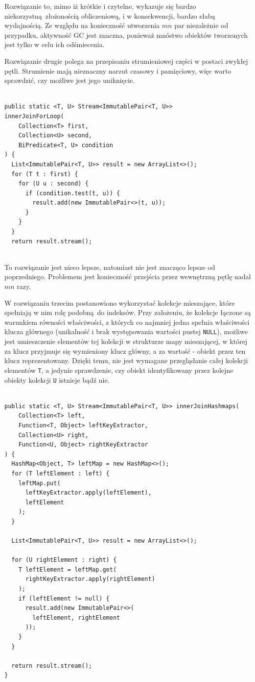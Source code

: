 \documentclass[12pt]{extarticle}
\begin{document}
    Rozwiązanie to, mimo iż krótkie i czytelne, wykazuje się bardzo niekorzystną złożonością obliczeniową, i w konsekwencji, bardzo słabą wydajnością. Ze względu na konieczność utworzenia $ mn $ par niezależnie od przypadku, aktywność GC jest znaczna, ponieważ mnóstwo obiektów tworzonych jest tylko w celu ich odśmiecenia.

    Rozwiązanie drugie polega na przepisaniu strumieniowej części w postaci zwykłej pętli. Strumienie mają nieznaczny narzut czasowy i pamięciowy, więc warto sprawdzić, czy możliwe jest jego uniknięcie.

\begin{lstlisting}[label=join2, caption=Rozwiązanie nr 2]

public static <T, U> Stream<ImmutablePair<T, U>>
innerJoinForLoop(
    Collection<T> first,
    Collection<U> second,
    BiPredicate<T, U> condition
) {
  List<ImmutablePair<T, U>> result = new ArrayList<>();
  for (T t : first) {
    for (U u : second) {
      if (condition.test(t, u)) {
        result.add(new ImmutablePair<>(t, u));
      }
    }
  }
  return result.stream();
    

\end{lstlisting}

    To rozwiązanie jest nieco lepsze, natomiast nie jest znacząco lepsze od poprzedniego. Problemem jest konieczność przejścia przez wewnętrzną pętlę nadal $ mn $ razy.

    W rozwiązaniu trzecim postanowiono wykorzystać kolekcje mieszające, które spełniają w nim rolę podobną do indeksów. Przy założeniu, że kolekcje łączone są warunkiem równości właściwości, z których co najmniej jedna spełnia właściwości klucza głównego (unikalność i brak występowania wartości pustej \texttt{NULL}), możliwe jest umieszczenie elementów tej kolekcji w strukturze mapy mieszającej, w której za klucz przyjmuje się wymieniony klucz główny, a za wartość - obiekt przez ten klucz reprezentowany. Dzięki temu, nie jest wymagane przeglądanie całej kolekcji elementów \texttt{T}, a jedynie sprawdzenie, czy obiekt identyfikowany przez kolejne obiekty kolekcji \texttt{U} istnieje bądź nie.

\begin{lstlisting}[label=join3, caption=Rozwiązanie nr 3]

public static <T, U> Stream<ImmutablePair<T, U>> innerJoinHashmaps(
    Collection<T> left,
    Function<T, Object> leftKeyExtractor,
    Collection<U> right,
    Function<U, Object> rightKeyExtractor
) {
  HashMap<Object, T> leftMap = new HashMap<>();
  for (T leftElement : left) {
    leftMap.put(
      leftKeyExtractor.apply(leftElement),
      leftElement
    );
  }
  
  List<ImmutablePair<T, U>> result = new ArrayList<>();
  
  for (U rightElement : right) {
    T leftElement = leftMap.get(
      rightKeyExtractor.apply(rightElement)
    );
    if (leftElement != null) {
      result.add(new ImmutablePair<>(
        leftElement, rightElement
      ));
    }
  }
  
  return result.stream();
}
\end{lstlisting}
\end{document}
